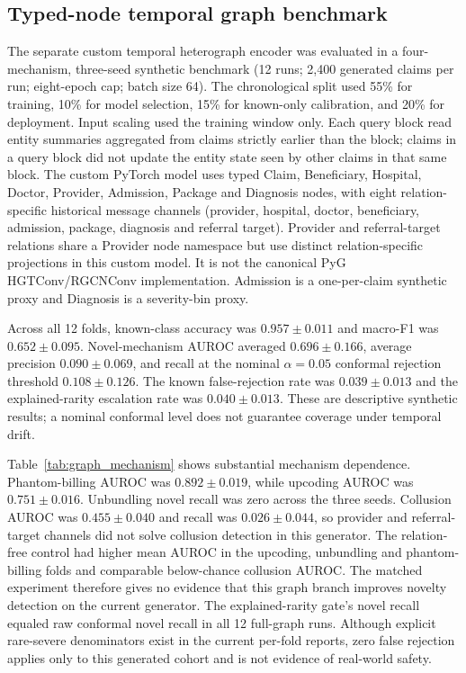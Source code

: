 \documentclass[conference]{IEEEtran}
\begin{document}
\subsection{Typed-node temporal graph benchmark}
The separate custom temporal heterograph encoder was evaluated in a four-mechanism, three-seed synthetic benchmark (12 runs; 2,400 generated claims per run; eight-epoch cap; batch size 64). The chronological split used 55\% for training, 10\% for model selection, 15\% for known-only calibration, and 20\% for deployment. Input scaling used the training window only. Each query block read entity summaries aggregated from claims strictly earlier than the block; claims in a query block did not update the entity state seen by other claims in that same block. The custom PyTorch model uses typed Claim, Beneficiary, Hospital, Doctor, Provider, Admission, Package and Diagnosis nodes, with eight relation-specific historical message channels (provider, hospital, doctor, beneficiary, admission, package, diagnosis and referral target). Provider and referral-target relations share a Provider node namespace but use distinct relation-specific projections in this custom model. It is not the canonical PyG HGTConv/RGCNConv implementation. Admission is a one-per-claim synthetic proxy and Diagnosis is a severity-bin proxy.

Across all 12 folds, known-class accuracy was $0.957\pm0.011$ and macro-F1 was $0.652\pm0.095$. Novel-mechanism AUROC averaged $0.696\pm0.166$, average precision $0.090\pm0.069$, and recall at the nominal $\alpha=0.05$ conformal rejection threshold $0.108\pm0.126$. The known false-rejection rate was $0.039\pm0.013$ and the explained-rarity escalation rate was $0.040\pm0.013$. These are descriptive synthetic results; a nominal conformal level does not guarantee coverage under temporal drift.

Table~\ref{tab:graph_mechanism} shows substantial mechanism dependence. Phantom-billing AUROC was $0.892\pm0.019$, while upcoding AUROC was $0.751\pm0.016$. Unbundling novel recall was zero across the three seeds. Collusion AUROC was $0.455\pm0.040$ and recall was $0.026\pm0.044$, so provider and referral-target channels did not solve collusion detection in this generator. The relation-free control had higher mean AUROC in the upcoding, unbundling and phantom-billing folds and comparable below-chance collusion AUROC. The matched experiment therefore gives no evidence that this graph branch improves novelty detection on the current generator. The explained-rarity gate's novel recall equaled raw conformal novel recall in all 12 full-graph runs. Although explicit rare-severe denominators exist in the current per-fold reports, zero false rejection applies only to this generated cohort and is not evidence of real-world safety.
\end{document}
